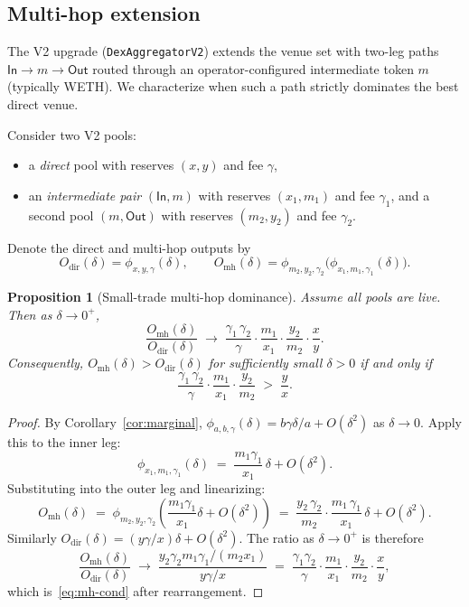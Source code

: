 \documentclass[11pt,a4paper]{article}
\newtheorem{proposition}[theorem]{Proposition}
\theoremstyle{definition}
\begin{document}
\subsection{Multi-hop extension}
\label{sec:multihop}

The V2 upgrade (\texttt{DexAggregatorV2}) extends the venue set with two-leg
paths $\mathsf{In} \to m \to \mathsf{Out}$ routed through an operator-configured
intermediate token $m$ (typically WETH). We characterize when such a path
strictly dominates the best direct venue.

Consider two V2 pools:
\begin{itemize}[leftmargin=*]
    \item a \emph{direct} pool with reserves $(x, y)$ and fee $\gamma$,
    \item an \emph{intermediate pair} $(\mathsf{In}, m)$ with reserves $(x_1, m_1)$
          and fee $\gamma_1$, and a second pool $(m, \mathsf{Out})$ with
          reserves $(m_2, y_2)$ and fee $\gamma_2$.
\end{itemize}

Denote the direct and multi-hop outputs by
\[
    O_{\mathrm{dir}}(\delta) = \phi_{x, y, \gamma}(\delta),
    \qquad
    O_{\mathrm{mh}}(\delta) = \phi_{m_2, y_2, \gamma_2}\!\bigl(\phi_{x_1, m_1, \gamma_1}(\delta)\bigr).
\]

\begin{proposition}[Small-trade multi-hop dominance]
\label{prop:multihop}
Assume all pools are live. Then as $\delta \to 0^+$,
\[
    \frac{O_{\mathrm{mh}}(\delta)}{O_{\mathrm{dir}}(\delta)}
    \;\longrightarrow\;
    \frac{\gamma_1\,\gamma_2}{\gamma}
    \cdot
    \frac{m_1}{x_1}
    \cdot
    \frac{y_2}{m_2}
    \cdot
    \frac{x}{y}.
\]
Consequently, $O_{\mathrm{mh}}(\delta) > O_{\mathrm{dir}}(\delta)$ for
sufficiently small $\delta > 0$ if and only if
\begin{equation}
    \frac{\gamma_1\,\gamma_2}{\gamma}
    \cdot
    \frac{m_1}{x_1}
    \cdot
    \frac{y_2}{m_2}
    \;>\;
    \frac{y}{x}.
    \label{eq:mh-cond}
\end{equation}
\end{proposition}

\begin{proof}
By Corollary~\ref{cor:marginal},
$\phi_{a,b,\gamma}(\delta) = b\gamma\delta/a + O(\delta^2)$ as $\delta \to 0$.
Apply this to the inner leg:
\[
    \phi_{x_1, m_1, \gamma_1}(\delta) \;=\; \frac{m_1 \gamma_1}{x_1}\,\delta + O(\delta^2).
\]
Substituting into the outer leg and linearizing:
\[
    O_{\mathrm{mh}}(\delta)
    \;=\; \phi_{m_2, y_2, \gamma_2}\!\left( \frac{m_1 \gamma_1}{x_1}\delta + O(\delta^2) \right)
    \;=\; \frac{y_2\,\gamma_2}{m_2} \cdot \frac{m_1\,\gamma_1}{x_1} \, \delta + O(\delta^2).
\]
Similarly $O_{\mathrm{dir}}(\delta) = (y\gamma / x)\delta + O(\delta^2)$. The ratio
as $\delta \to 0^+$ is therefore
\[
    \frac{O_{\mathrm{mh}}(\delta)}{O_{\mathrm{dir}}(\delta)}
    \;\longrightarrow\;
    \frac{y_2\gamma_2 m_1 \gamma_1 / (m_2 x_1)}{y\gamma / x}
    \;=\; \frac{\gamma_1 \gamma_2}{\gamma} \cdot \frac{m_1}{x_1} \cdot \frac{y_2}{m_2} \cdot \frac{x}{y},
\]
which is~\eqref{eq:mh-cond} after rearrangement.
\end{proof}
\end{document}
